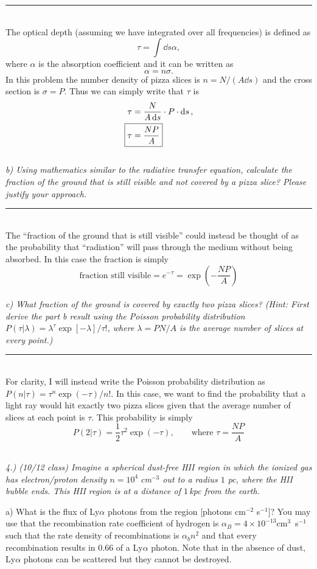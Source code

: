 \documentclass[12pt, letterpaper, twoside]{article}
\newcommand{\answer}[1]{
    \par\noindent\rule{\textwidth}{0.4pt}\\#1\\
}
\begin{document}
\answer{
    The optical depth (assuming we have integrated over all frequencies) is defined as
    \begin{equation}
        \tau = \int \dd{s} \alpha,
    \end{equation}
    where $\alpha$ is the absorption coefficient and it can be written as
    \begin{equation}
        \alpha = n \sigma.
    \end{equation}
    In this problem the number density of pizza slices is $n = N / (A \dd{s})$ and the cross section is $\sigma = P$. Thus we can simply write that $\tau$ is
    \begin{align}
        \tau &= \frac{N}{A \dd{s}} \cdot P \cdot \dd{s},\\
        \Aboxed{ \tau &= \frac{N P}{A} }
    \end{align}
}

{\it b) Using mathematics similar to the radiative transfer equation, calculate the fraction of the ground that is still visible and not covered by a pizza slice? Please justify your approach.}

\answer{
    The ``fraction of the ground that is still visible'' could instead be thought of as the probability that ``radiation'' will pass through the medium without being absorbed. In this case the fraction is simply
    \begin{equation}
        \boxed{ \text{fraction still visible} = e^{-\tau} = \exp(-\frac{NP}{A}) }
    \end{equation}
}

{\it c) What fraction of the ground is covered by exactly two pizza slices? {\it (Hint: First derive the part b result using the Poisson probability distribution $P(\tau | \lambda) = \lambda^\tau \exp[-\lambda]/\tau!$, where $\lambda = P N/A$ is the average number of slices at every point.)}}

\answer{
    For clarity, I will instead write the Poisson probability distribution as $P(n | \tau) = \tau^n \exp(-\tau) / n!$. In this case, we want to find the probability that a light ray would hit exactly two pizza slices given that the average number of slices at each point is $\tau$. This probability is simply
    \begin{equation}
        \boxed{ P(2 | \tau) = \frac{1}{2} \tau^2 \exp(-\tau),\qquad \text{where } \tau = \frac{NP}{A} }
    \end{equation}
}

{\it 4.)   {\it (10/12 class)} Imagine a spherical dust-free HII region in which the ionized gas has electron/proton density $n=10^4 \;$cm$^{-3}$ out to a radius $1$ pc, where the HII bubble ends.  This HII region is at a distance of $1\,$kpc from the earth. 

\noindent a) What is the flux of Ly$\alpha$ photons from the region [photons cm$^{-2}$ s$^{-1}$]?   You may use that the recombination rate coefficient of hydrogen is $\alpha_B= 4\times10^{-13}$cm$^3$~s$^{-1}$ such that the rate density of recombinations is $\alpha_b n^2$ and that every recombination results in $0.66$ of a Ly$\alpha$ photon. Note that in the absence of dust, Ly$\alpha$ photons can be scattered but they cannot be destroyed.}
\end{document}
